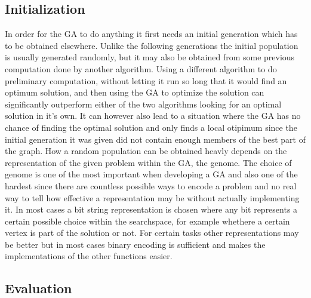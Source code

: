 \subsection{Initialization}
\label{sec:initialization}

In order for the GA to do anything it first needs an initial generation which has to be obtained elsewhere. Unlike the following generations the initial population is usually generated randomly, but it may also be obtained from some previous computation done by another algorithm. Using a different algorithm to do preliminary computation, without letting it run so long that it would find an optimum solution, and then using the GA to optimize the solution can significantly outperform either of the two algorithms looking for an optimal solution in it's own. It can however also lead to a situation where the GA has no chance of finding the optimal solution and only finds a local otipimum since the initial generation it was given did not contain enough members of the best part of the graph.
How a random population can be obtained heavly depends on the representation of the given problem within the GA, the genome. The choice of genome is one of the most important when developing a GA and also one of the hardest since there are countless possible ways to encode a problem and no real way to tell how effective a representation may be without actually implementing it. In most cases a bit string representation is chosen where any bit represents a certain possible choice within the searchspace, for example whethere a certain vertex is part of the solution or not. For certain tasks other representations may be better but in most cases binary encoding is sufficient and makes the implementations of the other functions easier.

\subsection{Evaluation}
\label{sec:evaluation}

